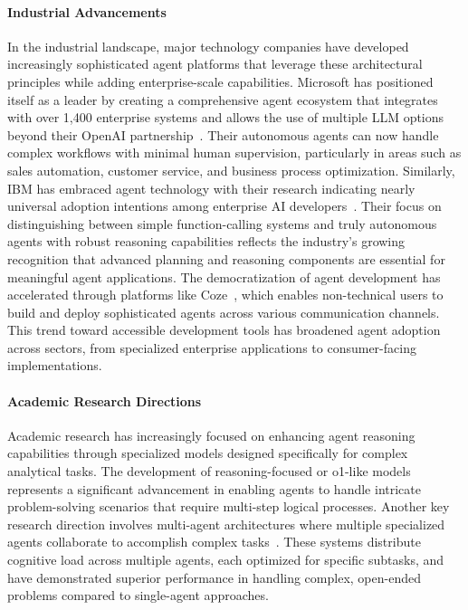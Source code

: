 \documentclass[10pt,preprint]{article}
\begin{document}
\paragraph{Industrial Advancements}
In the industrial landscape, major technology companies have developed increasingly sophisticated agent platforms that leverage these architectural principles while adding enterprise-scale capabilities.   Microsoft has positioned itself as a leader by creating a comprehensive agent ecosystem that integrates with over 1,400 enterprise systems and allows the use of multiple LLM options beyond their OpenAI partnership~\citep{microsoft2024agents}.   Their autonomous agents can now handle complex workflows with minimal human supervision, particularly in areas such as sales automation, customer service, and business process optimization.
Similarly, IBM has embraced agent technology with their research indicating nearly universal adoption intentions among enterprise AI developers~\citep{ibm2024agent}.   Their focus on distinguishing between simple function-calling systems and truly autonomous agents with robust reasoning capabilities reflects the industry's growing recognition that advanced planning and reasoning components are essential for meaningful agent applications.
The democratization of agent development has accelerated through platforms like Coze~\citep{trustedby2024coze}, which enables non-technical users to build and deploy sophisticated agents across various communication channels.   This trend toward accessible development tools has broadened agent adoption across sectors, from specialized enterprise applications to consumer-facing implementations.

\paragraph{Academic Research Directions}
Academic research has increasingly focused on enhancing agent reasoning capabilities through specialized models designed specifically for complex analytical tasks. The development of reasoning-focused or o1-like models \citep{jaech2024openai} represents a significant advancement in enabling agents to handle intricate problem-solving scenarios that require multi-step logical processes.
Another key research direction involves multi-agent architectures where multiple specialized agents collaborate to accomplish complex tasks~\citep{yang2024llmbasedmultiagentsystemstechniques,Guo2024LargeLM,yang2025agentnetdecentralizedevolutionarycoordination,Multi-Agent-as-a-Service}. These systems distribute cognitive load across multiple agents, each optimized for specific subtasks, and have demonstrated superior performance in handling complex, open-ended problems compared to single-agent approaches.
\end{document}

